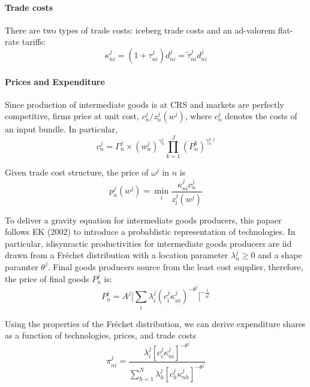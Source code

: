 \paragraph{Trade costs}
There are two types of trade costs: iceberg trade costs and an ad-valorem flat-rate tariffs:
\begin{equation}
    \kappa_{ni}^j = (1 + \tau_{ni}^j) d_{ni}^j = \tilde{\tau}_{ni}^j d_{ni}^j 
\end{equation}


\paragraph{Prices and Expenditure}
Since production of intermediate goods is at CRS and markets are perfectly competitive,
firms price at unit cost, $c_n^j / z_n^j(w^j)$,
where $c_n^j$ denotes the costs of an input bundle.
In particular,
\begin{equation}
    c_n^j = \Gamma_n^j \times (w_n^j)^{\gamma_n^j} \prod_{k=1}^J (P_{n}^k)^{\gamma_n^{k,j}}
\end{equation}

Given trade cost structure, the price of $\omega^j$ in $n$ is 
\begin{equation}
    p_n^j(w^j) = \min_i \frac{\kappa_{ni}^j c_n^j}{z_i^j(w^j)}
\end{equation}

To deliver a gravity equation for intermediate goods producers, 
this papaer follows EK (2002) to introduce a probablistic representation of technologies.
In particular, 
idisynractic productivities for intermediate goods producers are iid drawn from a Fr\'echet distribution with a location parameter $\lambda_n^j \geq 0$
and a shape paramter $\theta^j$.
Final goods producers source from the least cost supplier, therefore, the price of final goods $P_n^j$ is:
\begin{equation}
    P_n^j = A^j \bigg[\sum_{i}\lambda_i^j(c_i^j \kappa_{ni}^j)^{-\theta^j} \bigg]^{-\frac{1}{\theta^j}}
\end{equation}




Using the properties of the Fr\'{e}chet distribution, 
we can derive expenditure shares as a function of technologies, prices, and trade costs
\begin{equation}
\label{eqn:CP_2015:gravity}
\pi_{n i}^j=\frac{\lambda_i^j\left[c_i^j \kappa_{n i}^j\right]^{-\theta^j}
    }{
    \sum_{h=1}^N \lambda_h^j\left[c_h^j \kappa_{n h}^j\right]^{-\theta^j}
    }
\end{equation}


